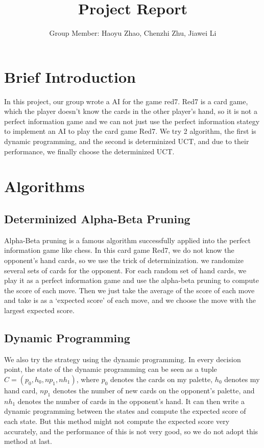 \documentclass{article}
\title{\textbf{Project Report}}
\author{Group Member: Haoyu Zhao, Chenzhi Zhu, Jiawei Li}
\date{}
\begin{document}
\maketitle
\section{Brief Introduction}
In this project, our group wrote a AI for the game red7. Red7 is a card game, which the player doesn't know the cards in the other player's hand, so it is not a perfect information game and we can not just use the perfect information stategy to implement an AI to play the card game Red7. We try 2 algorithm, the first is dynamic programming, and the second is determinized UCT, and due to their performance, we finally choose the determinized UCT.

\section{Algorithms}

\subsection{Determinized Alpha-Beta Pruning}
Alpha-Beta pruning is a famous algorithm successfully applied into the perfect information game like chess. In this card game Red7, we do not know the opponent's hand cards, so we use the trick of determinization. we randomize several sets of cards for the opponent. For each random set of hand cards, we play it as a perfect information game and use the alpha-beta pruning to compute the score of each move. Then we just take the average of the score of each move and take is as a `expected score' of each move, and we choose the move with the largest expected score.

\subsection{Dynamic Programming}
We also try the strategy using the dynamic programming. In every decision point, the state of the dynamic programming can be seen as a tuple $C = (p_0,h_0,np_1,nh_1)$, where $p_0$ denotes the cards on my palette, $h_0$ denotes my hand card, $np_1$ denotes the number of new cards on the opponent's palette, and $nh_1$ denotes the number of cards in the opponent's hand. It can then write a dynamic programming between the states and compute the expected score of each state. But this method might not compute the expected score very accurately, and the performance of this is not very good, so we do not adopt this method at last.
\end{document}
